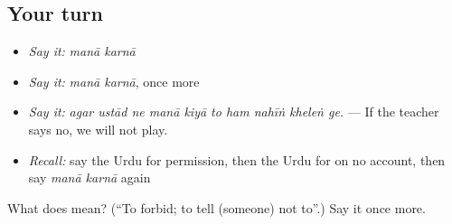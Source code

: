 \subsection*{Your turn}
\begin{itemize}
\raggedright
  \item \emph{Say it:} \emph{manā karnā}
  \item \emph{Say it:} \emph{manā karnā}, once more
  \item \emph{Say it:} \emph{agar ustād ne manā kiyā to ham nahīṅ kheleṅ ge.} — If the teacher says no, we will not play.
  \item \emph{Recall:} say the Urdu for permission, then the Urdu for on no account, then say \emph{manā karnā} again
\end{itemize}

\begin{tcolorbox}[breakable,colback=teal!4,colframe=teal!35!black,title={Before you move on}]
What does   mean? (\textquotedblleft{}To forbid; to tell (someone) not to\textquotedblright{}.) Say it once more.
\end{tcolorbox}
